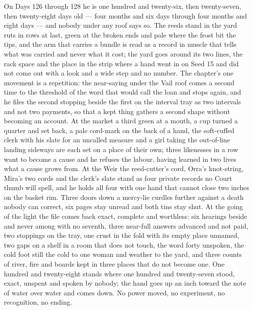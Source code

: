\documentclass{design/chronicle}
\begin{document}
{On Days 126 through 128 he is one hundred and twenty-six, then twenty-seven, then twenty-eight days old — four months and six days through four months and eight days — and nobody under any roof says so. The reeds stand in the yard ruts in rows at last, green at the broken ends and pale where the frost bit the tips, and the arm that carries a bundle is read as a record in muscle that tells what was carried and never what it cost; the yard goes around its two lines, the rack space and the place in the strip where a hand went in on Seed 15 and did not come out with a look and a wide step and no number. The chapter’s one movement is a repetition: the near-saying under the Vail roof comes a second time to the threshold of the word that would call the loan and stops again, and he files the second stopping beside the first on the interval tray as two intervals and not two payments, so that a kept thing gathers a second shape without becoming an account. At the market a third green at a mouth, a cup turned a quarter and set back, a pale cord-mark on the back of a hand, the soft-cuffed clerk with his slate for an uncalled measure and a girl taking the out-of-line landing sideways are each set on a place of their own; three likenesses in a row want to become a cause and he refuses the labour, having learned in two lives what a cause grows from. At the Weir the reed-cutter’s cord, Orra’s knot-string, Mira’s two cords and the clerk’s slate stand as four private records no Court thumb will spell, and he holds all four with one hand that cannot close two inches on the basket rim. Three doors down a mercy-lie curdles further against a death nobody can correct, six pages stay unread and both tins stay shut. At the going of the light the file comes back exact, complete and worthless: six hearings beside and never among with no seventh, three near-full answers advanced and not paid, two stoppings on the tray, one crust in the fold with its empty place unnamed, two gaps on a shelf in a room that does not touch, the word forty unspoken, the cold foot still the cold to one woman and weather to the yard, and three counts of river, fire and boards kept in three places that do not become one. One hundred and twenty-eight stands where one hundred and twenty-seven stood, exact, unspent and spoken by nobody; the hand goes up an inch toward the note of water over water and comes down. No power moved, no experiment, no recognition, no ending.

\begin{itemize}[leftmargin=1.4em,itemsep=1pt,topsep=3pt,parsep=0pt]


\end{itemize}}
\end{document}
